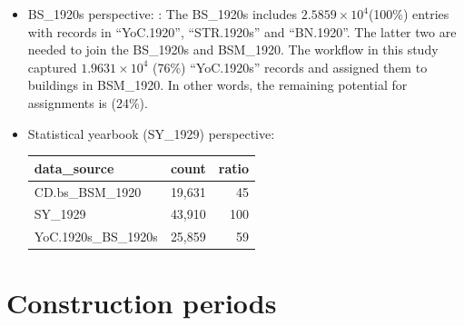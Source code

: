 \documentclass[
]{article}
\begin{document}
\begin{itemize}
\item
  BS\_1920s perspective: : The BS\_1920s includes
  \ensuremath{2.5859\times 10^{4}}(100\%) entries with records in
  ``YoC.1920'', ``STR.1920s'' and ``BN.1920''. The latter two are needed
  to join the BS\_1920s and BSM\_1920. The workflow in this study
  captured \ensuremath{1.9631\times 10^{4}} (76\%) ``YoC.1920s'' records
  and assigned them to buildings in BSM\_1920. In other words, the
  remaining potential for assignments is (24\%).
\item
  Statistical yearbook (SY\_1929) perspective:

  \begin{tabular}[t]{l|r|r}
  \hline
  data\_source & count & ratio\\
  \hline
  CD.bs\_BSM\_1920 & 19,631 & 45\\
  \hline
  SY\_1929 & 43,910 & 100\\
  \hline
  YoC.1920s\_BS\_1920s & 25,859 & 59\\
  \hline
  \end{tabular}
\end{itemize}

\hypertarget{construction-periods}{%
\section{Construction periods}\label{construction-periods}}
\end{document}
